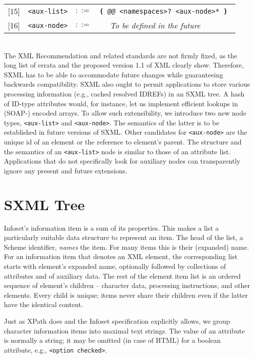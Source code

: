 \documentclass[10pt]{article}
\begin{document}
\begin{tabular}{rrcp{2.8in}}
{[}15{]} & \texttt{<aux-list>} &  $::=$ & \texttt{\textbf{(} {\itshape @@} <namespaces>? <aux-node>* \textbf{)} } \\
{[}16{]} & \texttt{<aux-node>} &  $::=$ & \texttt{~ } \emph{To be defined in the future}\\
\end{tabular}
\\
The XML Recommendation and related standards are not firmly
fixed, as the long list of errata and the proposed version 1.1 of XML
clearly show. Therefore, SXML has to be able to accommodate future
changes while guaranteeing backwards compatibility. SXML also ought to
permit applications to store various processing information (e.g.,
cached resolved IDREFs) in an SXML tree. A hash of ID-type attributes
would, for instance, let us implement efficient lookups in (SOAP-)
encoded arrays. To allow such extensibility, we introduce two new node
types, \texttt{<aux-list>} and \texttt{<aux-node>}. The semantics of
the latter is to be established in future versions of SXML. Other
candidates for \texttt{<aux-node>} are the unique id of an
element or the reference to element's parent. The structure and the
semantics of an \texttt{<aux-list>} node is similar to those of an attribute list. Applications that do not specifically look for auxiliary
nodes can transparently ignore any present and future extensions.

\section{SXML Tree}
Infoset's information item is a sum of its properties. This makes
a list a particularly suitable data structure to represent an
item. The head of the list, a Scheme identifier, \emph{names} the
item. For many items this is their (expanded) name. For an information
item that denotes an XML element, the corresponding list starts with
element's expanded name, optionally followed by collections of
attributes and of auxiliary data. The rest of the element item list
is an ordered sequence of element's children -- character data,
processing instructions, and other elements. Every child is unique;
items never share their children even if the latter have the identical
content.

Just as XPath does and the Infoset specification explicitly allows,
we group character information items into maximal text strings.  The
value of an attribute is normally a string; it may be omitted (in
case of HTML) for a boolean attribute, e.g., \texttt{<option checked>}.
\end{document}
